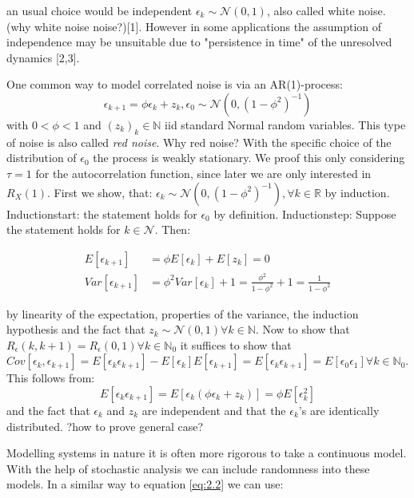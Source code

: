 \documentclass[%
thesis=student,%
coverpage=false,%
titlepage=false,%
headmarks=true, %
german,%
font=libertine, %
math=newpxtx, %
BCOR=5mm,%
coverBCOR=11mm%
]{tumbook}
\begin{document}
an usual choice would be independent $\epsilon_{k} \sim \mathcal{N}(0,1)$, also called white noise. (why white noise noise?)[1].
However in some applications the assumption of independence may be unsuitable due to "persistence in time" of the unresolved dynamics [2,3].

One common way to model correlated noise is via an AR(1)-process:
\[
\epsilon_{k+1} = \phi\epsilon_{k} + z_{k}, \epsilon_{0} \sim \mathcal{N}(0,(1-\phi^2)^{-1})
\]
with $0<\phi<1$ and $(z_{k})_{k}\in\mathbb{N}$ iid standard Normal random variables. This type of noise is also called \textit{red noise}. Why red noise? With the specific choice of the distribution of $\epsilon_{0}$ the process is weakly stationary. We proof this only considering $\tau = 1$ for the autocorrelation function, since later we are only interested in $R_{X}(1)$. First we show, that: $\epsilon_{k} \sim \mathcal{N}(0,(1-\phi^2)^{-1}), \forall k \in \mathbb{R}$ by induction. Inductionstart: the statement holds for $\epsilon_{0}$ by definition.
Inductionstep: Suppose the statement holds for $k \in \mathcal{N}$. Then:

\begin{subequations}
    \begin{align}
        E[\epsilon_{k+1}] &= \phi E[\epsilon_{k}] + E[z_{k}]  = 0 \\
        Var[\epsilon_{k+1}] &= \phi^2 Var[\epsilon_{k}] + 1 = \frac{\phi^2}{1-\phi^2} + 1 = \frac{1}{1-\phi^2}     
    \end{align}
\end{subequations}   

by linearity of the expectation, properties of the variance, the induction hypothesis and the fact that $z_{k} \sim \mathcal{N}(0,1) \forall k \in \mathbb{N}$. Now to show that $R_{\epsilon}(k,k+1) = R_{\epsilon}(0,1) \forall k \in \mathbb{N}_{0}$ it suffices to show that $Cov[\epsilon_{k},\epsilon_{k+1}] = E[\epsilon_{k}\epsilon_{k+1}] - E[\epsilon_{k}]E[\epsilon_{k+1}] = E[\epsilon_{k}\epsilon_{k+1}] = E[\epsilon_{0}\epsilon_{1}] \forall k \in \mathbb{N}_{0}$. This follows from: 
\[
E[\epsilon_{k}\epsilon_{k+1}] = E[\epsilon_{k}(\phi\epsilon_{k} + z_{k})] = \phi E[\epsilon_{k}^2]
\]
and the fact that $\epsilon_{k}$ and $z_{k}$ are independent and that the $\epsilon_{k}$'s are identically distributed. ?how to prove general case?

Modelling systems in nature it is often more rigorous to take a continuous model. With the help of stochastic analysis we can include randomness into these models. In a similar way to equation \ref{eq:2.2} we can use: 
\end{document}
